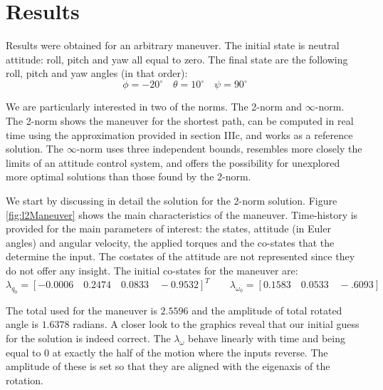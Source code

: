 \section{Results}

Results were obtained for an arbitrary maneuver. The initial state is neutral attitude: roll, pitch and yaw all equal to zero. The final state are the following roll, pitch and yaw angles (in that order):
\begin{equation}
\phi=-20^\circ \quad \theta=10^\circ \quad \psi=90^\circ
\end{equation}

We are particularly interested in two of the norms. The 2-norm and $\infty$-norm. The 2-norm shows the maneuver for the shortest path, can be computed in real time using the approximation provided in section IIIc, and works as a reference solution. The $\infty$-norm uses three independent bounds, resembles more closely the limits of an attitude control system, and offers the possibility for unexplored more optimal solutions than those found by the 2-norm.

We start by discussing in detail the solution for the 2-norm solution. Figure \ref{fig:l2Maneuver} shows the main characteristics of the maneuver. Time-history is provided for the main parameters of interest: the states, attitude (in Euler angles) and angular velocity, the applied torques and the co-states that the determine the input. The costates of the attitude are not represented since they do not offer any insight. The initial co-states for the maneuver are:
\begin{equation}
\lambda_{q_0} = [-0.0006 \quad 0.2474 \quad 0.0833 \quad -0.9532]^T \qquad
\lambda_{\omega_0} = [0.1583 \quad 0.0533 \quad -.6093]
\end{equation}

The total used for the maneuver is $2.5596$ and the amplitude of total rotated angle is $1.6378$ radians. A closer look to the graphics reveal that our initial guess for the solution is indeed correct. The $\lambda_{\omega}$ behave linearly with time and being equal to 0 at exactly the half of the motion where the inputs reverse. The amplitude of these is set so that they are aligned with the eigenaxis of the rotation.

